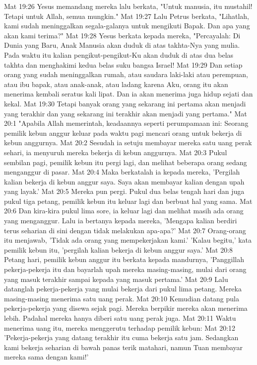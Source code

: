 Mat 19:26  Yesus memandang mereka lalu berkata, "Untuk manusia, itu mustahil! Tetapi untuk Allah, semua mungkin."
Mat 19:27  Lalu Petrus berkata, "Lihatlah, kami sudah meninggalkan segala-galanya untuk mengikuti Bapak. Dan apa yang akan kami terima?"
Mat 19:28  Yesus berkata kepada mereka, "Percayalah: Di Dunia yang Baru, Anak Manusia akan duduk di atas takhta-Nya yang mulia. Pada waktu itu kalian pengikut-pengikut-Ku akan duduk di atas dua belas takhta dan menghakimi kedua belas suku bangsa Israel!
Mat 19:29  Dan setiap orang yang sudah meninggalkan rumah, atau saudara laki-laki atau perempuan, atau ibu bapak, atau anak-anak, atau ladang karena Aku, orang itu akan menerima kembali seratus kali lipat. Dan ia akan menerima juga hidup sejati dan kekal.
Mat 19:30  Tetapi banyak orang yang sekarang ini pertama akan menjadi yang terakhir dan yang sekarang ini terakhir akan menjadi yang pertama."
Mat 20:1  "Apabila Allah memerintah, keadaannya seperti perumpamaan ini: Seorang pemilik kebun anggur keluar pada waktu pagi mencari orang untuk bekerja di kebun anggurnya.
Mat 20:2  Sesudah ia setuju membayar mereka satu uang perak sehari, ia menyuruh mereka bekerja di kebun anggurnya.
Mat 20:3  Pukul sembilan pagi, pemilik kebun itu pergi lagi, dan melihat beberapa orang sedang menganggur di pasar.
Mat 20:4  Maka berkatalah ia kepada mereka, 'Pergilah kalian bekerja di kebun anggur saya. Saya akan membayar kalian dengan upah yang layak.'
Mat 20:5  Mereka pun pergi. Pukul dua belas tengah hari dan juga pukul tiga petang, pemilik kebun itu keluar lagi dan berbuat hal yang sama.
Mat 20:6  Dan kira-kira pukul lima sore, ia keluar lagi dan melihat masih ada orang yang menganggur. Lalu ia bertanya kepada mereka, 'Mengapa kalian berdiri terus seharian di sini dengan tidak melakukan apa-apa?'
Mat 20:7  Orang-orang itu menjawab, 'Tidak ada orang yang mempekerjakan kami.' 'Kalau begitu,' kata pemilik kebun itu, 'pergilah kalian bekerja di kebun anggur saya.'
Mat 20:8  Petang hari, pemilik kebun anggur itu berkata kepada mandurnya, 'Panggillah pekerja-pekerja itu dan bayarlah upah mereka masing-masing, mulai dari orang yang masuk terakhir sampai kepada yang masuk pertama.'
Mat 20:9  Lalu datanglah pekerja-pekerja yang mulai bekerja dari pukul lima petang. Mereka masing-masing menerima satu uang perak.
Mat 20:10  Kemudian datang pula pekerja-pekerja yang disewa sejak pagi. Mereka berpikir mereka akan menerima lebih. Padahal mereka hanya diberi satu uang perak juga.
Mat 20:11  Waktu menerima uang itu, mereka menggerutu terhadap pemilik kebun:
Mat 20:12  'Pekerja-pekerja yang datang terakhir itu cuma bekerja satu jam. Sedangkan kami bekerja seharian di bawah panas terik matahari, namun Tuan membayar mereka sama dengan kami!'
